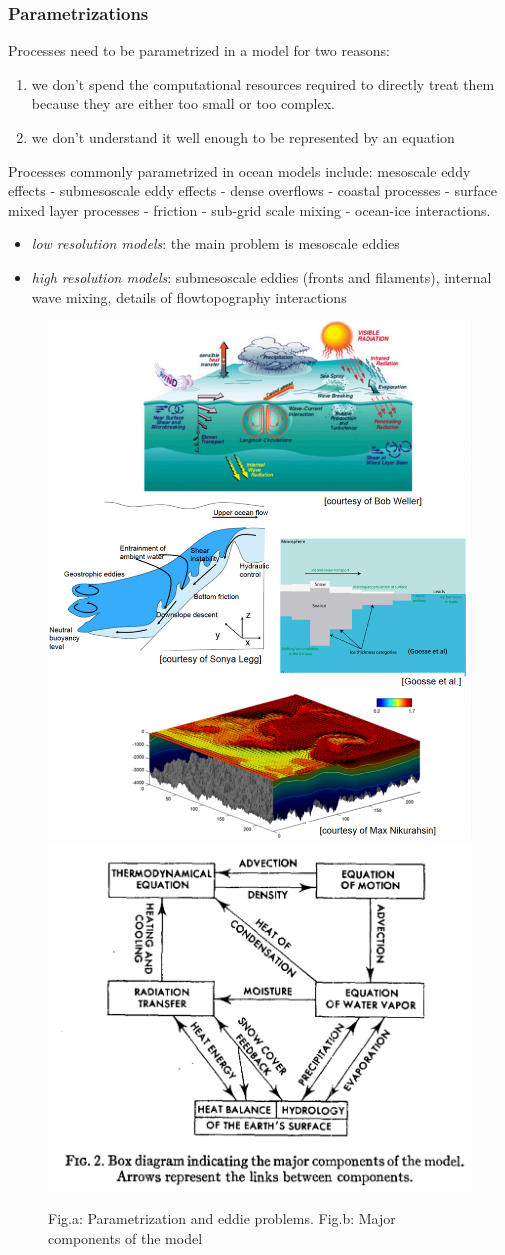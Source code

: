 \subsubsection{Parametrizations}
Processes need to be parametrized in a model for two reasons:
\begin{enumerate}
	\item we don't spend the computational resources required to directly treat them because they are either too small or too complex.
	\item we don't understand it well enough to be represented by an equation
\end{enumerate}
Processes commonly parametrized in ocean models include: mesoscale eddy effects - submesoscale eddy effects - dense
overflows - coastal processes - surface mixed layer processes
- friction - sub-grid scale mixing - ocean-ice interactions.
\begin{itemize}
	\item[] \textit{low resolution models}: the main problem is mesoscale eddies
	\item[] \textit{high resolution models}: submesoscale eddies (fronts and filaments), internal wave mixing, details of flowtopography interactions
\end{itemize}

\begin{figure}[htp!]
	\centering
	\includegraphics[width=0.4\linewidth]{uploads/Screenshot 2024-11-22 104603.png}\quad\includegraphics[width=0.35\linewidth]{uploads/Screenshot 2024-11-24 185214.png}
	\caption{Fig.a: Parametrization and eddie problems. Fig.b: Major components of the model}
	\label{...}
\end{figure}


